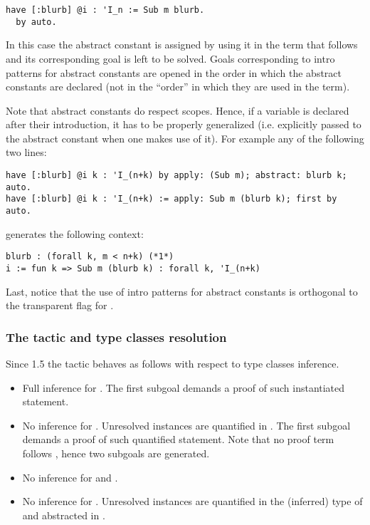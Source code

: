 \begin{lstlisting}
have [:blurb] @i : 'I_n := Sub m blurb.
  by auto.
\end{lstlisting}

In this case the abstract constant  is assigned by using it
in the term that follows \ssrC{:=} and its corresponding goal is left to
be solved.  Goals corresponding to intro patterns for abstract constants
are opened in the order in which the abstract constants are declared (not
in the ``order'' in which they are used in the term).

Note that abstract constants do respect scopes.  Hence, if a variable
is declared after their introduction, it has to be properly generalized (i.e.
explicitly passed to the abstract constant when one makes use of it).
For example any of the following two lines:
\begin{lstlisting}
have [:blurb] @i k : 'I_(n+k) by apply: (Sub m); abstract: blurb k; auto.
have [:blurb] @i k : 'I_(n+k) := apply: Sub m (blurb k); first by auto.
\end{lstlisting}
generates the following context:
\begin{lstlisting}
blurb : (forall k, m < n+k) (*1*)
i := fun k => Sub m (blurb k) : forall k, 'I_(n+k)
\end{lstlisting}

Last, notice that the use of intro patterns for abstract constants is
orthogonal to the transparent flag  for .

\subsubsection*{The  tactic and type classes resolution}
\label{ssec:havetcresolution}

Since \ssr{} 1.5 the  tactic behaves as follows with respect to type
classes inference.

\begin{itemize}
\item {}
        Full inference for .
        The first subgoal demands a proof of such instantiated statement.
\item {}
        No inference for . Unresolved instances are quantified in
        .  The first subgoal demands a proof of such quantified
        statement.  Note that no proof term follows \ssrC{:=}, hence two
        subgoals are generated.
\item {}
        No inference for  and .
\item {}
        No inference for . Unresolved instances are quantified in the
        (inferred) type of  and abstracted in .
\end{itemize}

